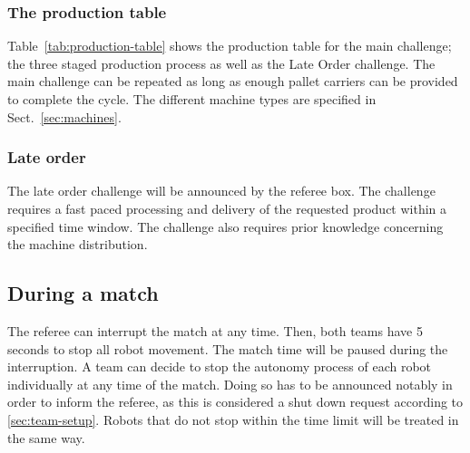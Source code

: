 \documentclass[12pt,twoside]{article}
\begin{document}




\subsubsection{The production table}

Table~\ref{tab:production-table} shows the production table for the
main challenge; the three staged production process as well as the
Late Order challenge. The main challenge can be repeated as long as
enough pallet carriers can be provided to complete the cycle. The
different machine types are specified in Sect.~\ref{sec:machines}.



\subsubsection{Late order}

The late order challenge will be announced by the referee box. The
challenge requires a fast paced processing and delivery of the
requested product within a specified time window. The challenge also
requires prior knowledge concerning the machine distribution.

\subsection{During a match}

The referee can interrupt the match at any time. Then, both teams have
5 seconds to stop all robot movement. The match time will be paused
during the interruption. A team can decide to stop the autonomy
process of each robot individually at any time of the match. Doing so
has to be announced notably in order to inform the referee, as this is
considered a shut down request according to
\ref{sec:team-setup}. Robots that do not stop within the time limit
will be treated in the same way.
\end{document}
